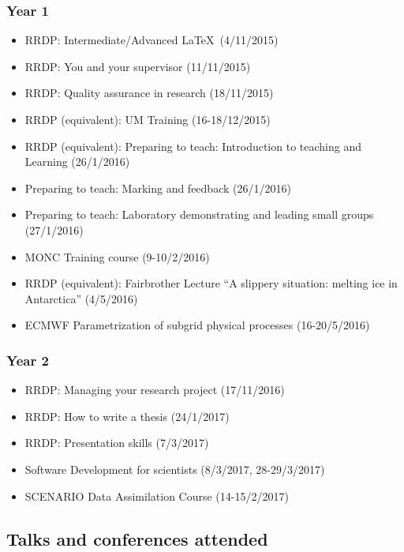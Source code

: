 \documentclass[11pt,a4paper]{article}
\begin{document}
\subsubsection*{Year 1}

\begin{itemize}
  \item RRDP: Intermediate/Advanced \LaTeX\ (4/11/2015)
  \item RRDP: You and your supervisor (11/11/2015)
  \item RRDP: Quality assurance in research (18/11/2015)
  \item RRDP (equivalent): UM Training (16-18/12/2015)
  \item RRDP (equivalent): Preparing to teach: Introduction to teaching and Learning (26/1/2016)
  \item Preparing to teach: Marking and feedback (26/1/2016)
  \item Preparing to teach: Laboratory demonstrating and leading small groups (27/1/2016)
  \item MONC Training course (9-10/2/2016)
  \item RRDP (equivalent): Fairbrother Lecture ``A slippery situation: melting ice in Antarctica'' (4/5/2016)
  \item ECMWF Parametrization of subgrid physical processes (16-20/5/2016)
\end{itemize}

\subsubsection*{Year 2}

\begin{itemize}
  \item RRDP: Managing your research project (17/11/2016)
  \item RRDP: How to write a thesis (24/1/2017)
  \item RRDP: Presentation skills (7/3/2017)
  \item Software Development for scientists (8/3/2017, 28-29/3/2017)
  \item SCENARIO Data Assimilation Course (14-15/2/2017)
\end{itemize}

\subsection*{Talks and conferences attended}
\end{document}
